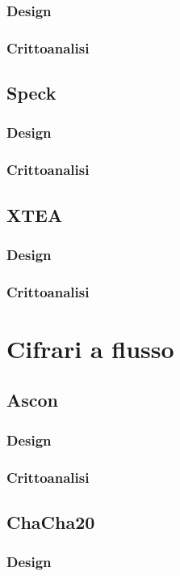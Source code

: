 \documentclass[target=bach,aauheader=,style=]{thud}
\begin{document}
			\subsubsection{Design}
			\subsubsection{Crittoanalisi}
		\subsection{Speck\cite{speck}}
			\subsubsection{Design}
			\subsubsection{Crittoanalisi}
		\subsection{XTEA}
			\subsubsection{Design}
			\subsubsection{Crittoanalisi}
	\section{Cifrari a flusso}
		\subsection{Ascon\cite{ascon}}
			\subsubsection{Design}
			\subsubsection{Crittoanalisi}
		\subsection{ChaCha20\cite{chacha20}}
			\subsubsection{Design}
\end{document}
